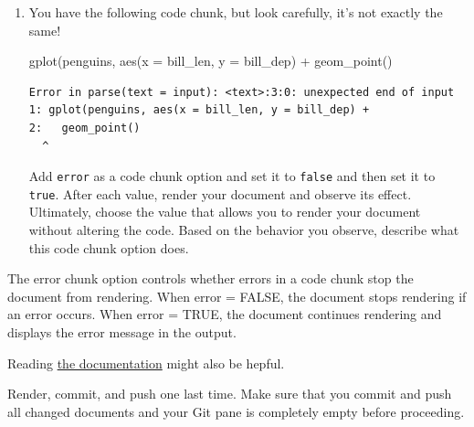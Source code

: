 \documentclass[
  letterpaper,
  DIV=11,
  numbers=noendperiod]{scrartcl}
\newenvironment{Shaded}{\begin{snugshade}}{\end{snugshade}}
\newcommand{\AttributeTok}[1]{\textcolor[rgb]{0.40,0.45,0.13}{#1}}
\newcommand{\FunctionTok}[1]{\textcolor[rgb]{0.28,0.35,0.67}{#1}}
\newcommand{\NormalTok}[1]{\textcolor[rgb]{0.00,0.23,0.31}{#1}}
\newcommand{\SpecialCharTok}[1]{\textcolor[rgb]{0.37,0.37,0.37}{#1}}
\begin{document}
\begin{enumerate}
\def\labelenumi{\alph{enumi}.}
\item
  You have the following code chunk, but look carefully, it's not
  exactly the same!

\begin{Shaded}
\begin{Highlighting}[]
\FunctionTok{gplot}\NormalTok{(penguins, }\FunctionTok{aes}\NormalTok{(}\AttributeTok{x =}\NormalTok{ bill\_len, }\AttributeTok{y =}\NormalTok{ bill\_dep) }\SpecialCharTok{+} 
  \FunctionTok{geom\_point}\NormalTok{()}
\end{Highlighting}
\end{Shaded}

\begin{verbatim}
Error in parse(text = input): <text>:3:0: unexpected end of input
1: gplot(penguins, aes(x = bill_len, y = bill_dep) + 
2:   geom_point()
  ^
\end{verbatim}

  Add \texttt{error} as a code chunk option and set it to \texttt{false}
  and then set it to \texttt{true}. After each value, render your
  document and observe its effect. Ultimately, choose the value that
  allows you to render your document without altering the code. Based on
  the behavior you observe, describe what this code chunk option does.
\end{enumerate}

The error chunk option controls whether errors in a code chunk stop the
document from rendering. When error = FALSE, the document stops
rendering if an error occurs. When error = TRUE, the document continues
rendering and displays the error message in the output.

\begin{tcolorbox}[enhanced jigsaw, coltitle=black, colbacktitle=quarto-callout-tip-color!10!white, colframe=quarto-callout-tip-color-frame, breakable, leftrule=.75mm, bottomtitle=1mm, left=2mm, opacityback=0, toptitle=1mm, titlerule=0mm, bottomrule=.15mm, title=\textcolor{quarto-callout-tip-color}{\faLightbulb}\hspace{0.5em}{Tip}, arc=.35mm, colback=white, opacitybacktitle=0.6, rightrule=.15mm, toprule=.15mm]

Reading
\href{https://quarto.org/docs/reference/formats/pdf.html\#execution}{the
documentation} might also be hepful.

\end{tcolorbox}

Render, commit, and push one last time. Make sure that you commit and
push all changed documents and your Git pane is completely empty before
proceeding.
\end{document}
